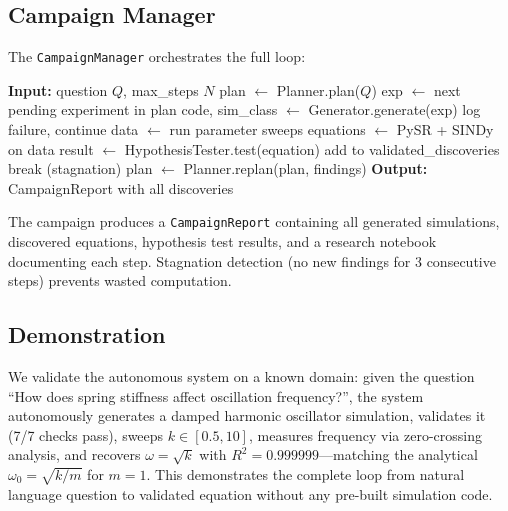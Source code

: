 \documentclass{article}
\begin{document}
\subsection{Campaign Manager}

The \texttt{CampaignManager} orchestrates the full loop:

\begin{algorithmic}
\STATE \textbf{Input:} question $Q$, max\_steps $N$
\STATE plan $\leftarrow$ Planner.plan($Q$)
  \STATE exp $\leftarrow$ next pending experiment in plan
  \STATE code, sim\_class $\leftarrow$ Generator.generate(exp)
    \STATE log failure, continue
  \ENDIF
  \STATE data $\leftarrow$ run parameter sweeps
  \STATE equations $\leftarrow$ PySR + SINDy on data
    \STATE result $\leftarrow$ HypothesisTester.test(equation)
      \STATE add to validated\_discoveries
    \ENDIF
  \ENDFOR
    \STATE break (stagnation)
  \ENDIF
  \STATE plan $\leftarrow$ Planner.replan(plan, findings)
\ENDFOR
\STATE \textbf{Output:} CampaignReport with all discoveries
\end{algorithmic}

The campaign produces a \texttt{CampaignReport} containing all generated
simulations, discovered equations, hypothesis test results, and a
research notebook documenting each step. Stagnation detection (no new
findings for 3 consecutive steps) prevents wasted computation.

\subsection{Demonstration}

We validate the autonomous system on a known domain: given the question
``How does spring stiffness affect oscillation frequency?'', the system
autonomously generates a damped harmonic oscillator simulation, validates
it (7/7 checks pass), sweeps $k \in [0.5, 10]$, measures frequency via
zero-crossing analysis, and recovers $\omega = \sqrt{k}$ with
$R^2 = 0.999999$---matching the analytical $\omega_0 = \sqrt{k/m}$
for $m=1$. This demonstrates the complete loop from natural language
question to validated equation without any pre-built simulation code.

\end{document}
